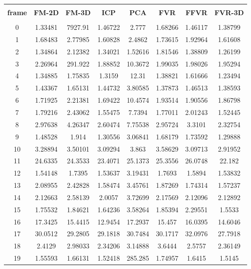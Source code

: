 \begin{center}
\begin{longtable}{cccccccc}
\hline \\
\textbf{frame} & \textbf{FM-2D} & \textbf{FM-3D} & \textbf{ICP} & \textbf{PCA} & \textbf{FVR} & \textbf{FFVR} & \textbf{FVR-3D} \\
\hline \\
0 & 1.33481 & 7927.91 & 1.46722 & 2.777 & 1.68266 & 1.46117 & 1.38799\\
1 & 1.68483 & 2.77985 & 1.60828 & 2.4862 & 1.73615 & 1.92964 & 1.61608\\
2 & 1.34864 & 2.12382 & 1.34021 & 1.52616 & 1.81546 & 1.38809 & 1.26199\\
3 & 2.26964 & 291.922 & 1.88852 & 10.3672 & 1.99035 & 1.98026 & 1.95294\\
4 & 1.34885 & 1.75835 & 1.3159 & 12.31 & 1.38821 & 1.61666 & 1.23494\\
5 & 1.43367 & 1.65131 & 1.44732 & 3.80585 & 1.37873 & 1.46513 & 1.38593\\
6 & 1.71925 & 2.21381 & 1.69422 & 10.4574 & 1.93514 & 1.90556 & 1.86798\\
7 & 1.79216 & 2.43062 & 1.55475 & 7.7394 & 1.77011 & 2.01243 & 1.52445\\
8 & 2.97638 & 4.26347 & 2.60474 & 7.75538 & 2.95724 & 3.3101 & 2.32754\\
9 & 1.48528 & 1.914 & 1.30556 & 3.06841 & 1.68179 & 1.73592 & 1.29888\\
10 & 3.28894 & 3.50101 & 3.09294 & 3.863 & 3.58629 & 3.09713 & 2.91952\\
11 & 24.6335 & 24.3533 & 23.4071 & 25.1373 & 25.3556 & 26.0748 & 22.182\\
12 & 1.54148 & 1.7395 & 1.53637 & 3.19431 & 1.7693 & 1.5894 & 1.53832\\
13 & 2.08955 & 2.42828 & 1.58474 & 3.45761 & 1.87269 & 1.74314 & 1.57237\\
14 & 2.12663 & 2.58139 & 2.0057 & 3.72699 & 2.17569 & 2.12096 & 2.12892\\
15 & 1.75532 & 1.84621 & 1.64236 & 3.58264 & 1.85394 & 2.29551 & 1.5533\\
16 & 17.3425 & 15.4415 & 12.9454 & 17.2937 & 15.457 & 16.0395 & 14.6046\\
17 & 30.0512 & 29.2805 & 29.1818 & 30.7484 & 30.1717 & 32.0976 & 27.7918\\
18 & 2.4129 & 2.98033 & 2.34206 & 3.14888 & 3.6444 & 2.5757 & 2.36149\\
19 & 1.55593 & 1.66131 & 1.52418 & 285.285 & 1.74957 & 1.6415 & 1.5145\\

\end{longtable}
\end{center}
